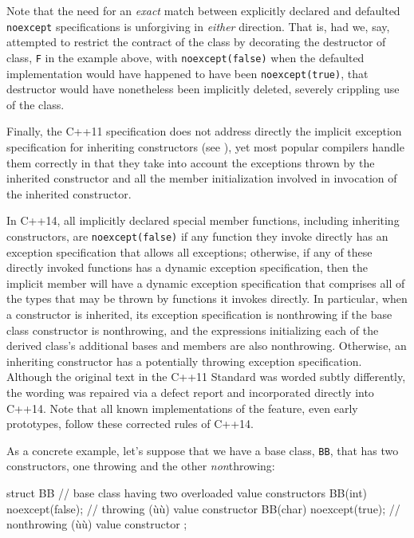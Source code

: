\noindent Note that the need for an \emph{exact} match between explicitly declared
and defaulted \lstinline!noexcept! specifications is unforgiving in
\emph{either} direction. That is, had we, say, attempted to restrict the
contract of the class by decorating the destructor of class, \lstinline!F!
in the example above, with \lstinline!noexcept(false)! when the defaulted
implementation would have happened to have been \lstinline!noexcept(true)!,
that destructor would have nonetheless been implicitly deleted, severely
crippling use of the class.

Finally, the C++11 specification does not address directly the implicit
exception specification for inheriting constructors (see
), yet most popular compilers
handle them correctly in that they take into account the exceptions
thrown by the inherited constructor and all the member initialization
involved in invocation of the inherited constructor.

In C++14, all implicitly declared special member functions, including
inheriting constructors, are \lstinline!noexcept(false)! if any function
they invoke directly has an exception specification that allows all
exceptions; otherwise, if any of these directly invoked functions has a
dynamic exception specification, then the implicit member will have a
dynamic exception specification that comprises all of the types that may
be thrown by functions it invokes directly. In particular, when a
constructor is inherited, its exception specification is nonthrowing if
the base class constructor is nonthrowing, and the expressions
initializing each of the derived class's additional bases and members
are also nonthrowing. Otherwise, an inheriting constructor has a
potentially throwing exception specification. Although the original text
in the C++11 Standard was worded subtly differently, the wording was
repaired via a defect report and incorporated directly into C++14. Note
that all known implementations of the feature, even early prototypes,
follow these corrected rules of C++14.

As a concrete example, let's suppose that we have a base class,
\lstinline!BB!, that has two  constructors, one throwing and
the other \emph{non}throwing:

\begin{emcppslisting}[emcppsbatch=e7]
struct BB  // base class having two overloaded value constructors
{
    BB(int)  noexcept(false);  //    throwing (ù{}ù)  value constructor
    BB(char) noexcept(true);   // nonthrowing (ù{}ù) value constructor
};
\end{emcppslisting}
    


